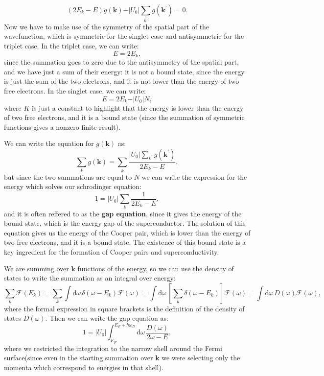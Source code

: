 \[
    (2E_k -E)g(\mathbf{k}) - \vert U_0 \vert \sum_{k^{\prime}} g(\mathbf{k}^{\prime}) = 0.
\]
Now we have to make use of the symmetry of the spatial part of the wavefunction, which is symmetric for the singlet case and antisymmetric for the triplet case. In the triplet case, we can write:
\[
    E = 2E_k,
\]
since the summation goes to zero due to the antisymmetry of the spatial part, and we have just a sum of their energy: it is not a bound state, since the energy is just the sum of the two electrons, and it is not lower than the energy of two free electrons. In the singlet case, we can write:
\[
    E = 2E_k - \vert U_0 \vert N,
\]
where \(K\) is just a constant to highlight that the energy is lower than the energy of two free electrons, and it is a bound state (since the summation of symmetric functions gives a nonzero finite result).

We can write the equation for \(g(\mathbf{k})\) as:
\[
    \sum_{k} g(\mathbf{k}) = \sum_{k} \frac{\vert U_0 \vert \sum_{k^{\prime} }g(\mathbf{k}^{\prime} ) }{2E_k - E},
\]
but since the two summations are equal to \(N\) we can write the expression for the energy which solves our schrodinger equation:
\[
    1 = \vert U_0 \vert \sum_{k} \frac{1}{2E_k - E},
\]
and it is often reffered to as the \textbf{gap equation}, since it gives the energy of the bound state, which is the energy gap of the superconductor. The solution of this equation gives us the energy of the Cooper pair, which is lower than the energy of two free electrons, and it is a bound state. The existence of this bound state is a key ingredient for the formation of Cooper pairs and superconductivity.

We are summing over \(\mathbf{k}\) functions of the energy, so we can use the density of states to write the summation as an integral over energy:
\[
    \sum_{k} \mathcal{F}(E_k) = \sum_{k} \int \mathrm{d}\omega \, \delta(\omega - E_k) \mathcal{F}(\omega) = \int \mathrm{d}\omega \, \left[ \sum_{k} \delta(\omega - E_k) \right] \mathcal{F}(\omega) = \int \mathrm{d}\omega \, D(\omega) \mathcal{F}(\omega),
\]
where the formal expression in square brackets is the definition of the density of states \(D(\omega)\). Then we can write the gap equation as:
\[
    1 = \vert U_0 \vert \int_{E_F}^{E_F + \hbar \omega_D} \mathrm{d}\omega \, \frac{D(\omega)}{2\omega - E},
\]
where we restricted the integration to the narrow shell around the Fermi surface(since even in the starting summation over \(\mathbf{k}\) we were selecting only the momenta which correspond to energies in that shell).


